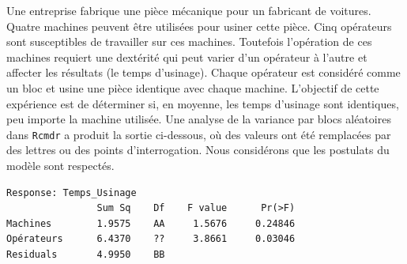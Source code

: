 \begin{questions}
\question\label{anovaBlocs} 
Une entreprise fabrique une pièce mécanique pour un fabricant de voitures. Quatre machines peuvent être utilisées pour usiner cette pièce. Cinq opérateurs sont susceptibles de travailler sur ces machines. Toutefois l'opération de ces machines requiert une  dextérité qui peut varier d'un opérateur à l'autre et affecter les résultats (le temps d'usinage). %
Chaque opérateur est considéré comme un bloc et usine une pièce identique avec chaque machine.
L'objectif de cette expérience est de déterminer si, en moyenne, les temps d'usinage sont identiques, peu importe la machine utilisée. Une analyse de la variance par blocs aléatoires dans \texttt{Rcmdr} a produit la sortie ci-dessous, où des valeurs ont été remplacées par des lettres ou des points d'interrogation. Nous considérons que les postulats 
 du modèle sont respectés.

\begin{verbatim}
Response: Temps_Usinage
                Sum Sq    Df    F value      Pr(>F)
Machines        1.9575    AA     1.5676     0.24846
Opérateurs      6.4370    ??     3.8661     0.03046 
Residuals       4.9950    BB
\end{verbatim}

\medskip

\end{questions}

